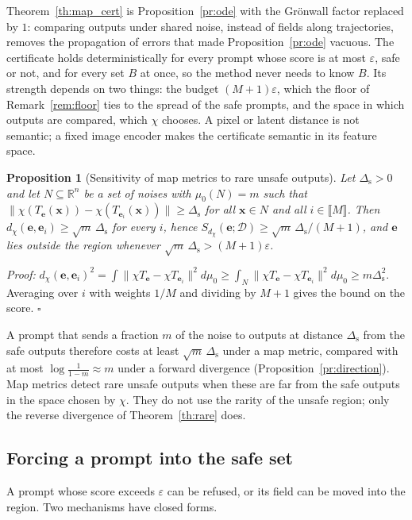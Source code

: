 \documentclass{article}
\newcommand{\RR}{\mathbb{R}}
\newcommand{\cD}{\mathcal{D}}                       %
\newcommand{\bx}{\mathbf{x}}
\newcommand{\be}{\mathbf{e}}                       %
\theoremstyle{plain}
\newtheorem{proposition}{Proposition}
\begin{document}
Theorem~\ref{th:map_cert} is Proposition~\ref{pr:ode} with the Gr\"onwall factor replaced by $1$:
comparing outputs under shared noise, instead of fields along trajectories, removes the propagation
of errors that made Proposition~\ref{pr:ode} vacuous. The certificate holds deterministically for every
prompt whose score is at most $\varepsilon$, safe or not, and for every set $B$ at once, so the method
never needs to know $B$. Its strength depends on two things: the budget $(M+1)\varepsilon$, which the floor
of Remark~\ref{rem:floor} ties to the spread of the safe prompts, and the space in which outputs are
compared, which $\chi$ chooses. A pixel or latent distance is not semantic; a fixed image encoder
makes the certificate semantic in its feature space.

\begin{proposition}[Sensitivity of map metrics to rare unsafe outputs]\label{pr:sqrt_m}
Let $\Delta_{\mathrm{s}}>0$ and let $N\subseteq\RR^n$ be a set of noises with $\mu_0(N)=m$ such that
$\|\chi(T_{\be}(\bx))-\chi(T_{\be_i}(\bx))\|\geq\Delta_{\mathrm{s}}$ for all $\bx\in N$ and all
$i\in\llbracket M\rrbracket$. Then $d_\chi(\be,\be_i)\geq\sqrt m\,\Delta_{\mathrm{s}}$ for every $i$, hence
$S_{d_\chi}(\be;\cD)\geq\sqrt m\,\Delta_{\mathrm{s}}/(M+1)$, and $\be$ lies outside the region whenever
$\sqrt m\,\Delta_{\mathrm{s}}>(M+1)\varepsilon$.
\end{proposition}
\textit{Proof:}
$d_\chi(\be,\be_i)^2=\int\|\chi T_{\be}-\chi T_{\be_i}\|^2d\mu_0\geq\int_N\|\chi T_{\be}-\chi T_{\be_i}\|^2d\mu_0\geq m\Delta_{\mathrm{s}}^2$.
Averaging over $i$ with weights $1/M$ and dividing by $M+1$ gives the bound on the score. \hfill $\square$

A prompt that sends a fraction $m$ of the noise to outputs at distance $\Delta_{\mathrm{s}}$ from the safe
outputs therefore costs at least $\sqrt m\,\Delta_{\mathrm{s}}$ under a map metric, compared with at most
$\log\frac{1}{1-m}\approx m$ under a forward divergence (Proposition~\ref{pr:direction}). Map metrics
detect rare unsafe outputs when these are far from the safe outputs in the space chosen by $\chi$.
They do not use the rarity of the unsafe region; only the reverse divergence of
Theorem~\ref{th:rare} does.

\subsection{Forcing a prompt into the safe set}\label{subsec:forcing}

A prompt whose score exceeds $\varepsilon$ can be refused, or its field can be moved into the region.
Two mechanisms have closed forms.
\end{document}
